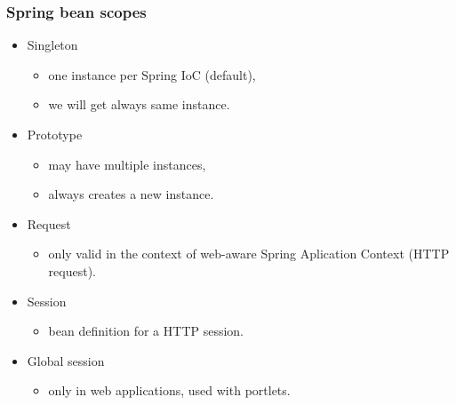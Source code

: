 \documentclass[10pt,xcolor=pdflatex, table]{beamer}
\begin{document}
\begin{frame}\frametitle{Spring bean scopes}
	\begin{itemize}
		\item Singleton
          \begin{itemize}
        	\item one instance per Spring IoC (default),
            \item we will get always same instance.
          \end{itemize}
		\item Prototype
          \begin{itemize}
        	\item may have multiple instances,
            \item always creates a new instance.
          \end{itemize}
		\item Request
          \begin{itemize}
        	\item only valid in the context of web-aware Spring Aplication Context (HTTP request).
          \end{itemize}
		\item Session
          \begin{itemize}
        	\item bean definition for a HTTP session.
          \end{itemize}
		\item Global session
          \begin{itemize}
        	\item only in web applications, used with portlets.
          \end{itemize}
	\end{itemize}
\end{frame}
\end{document}

